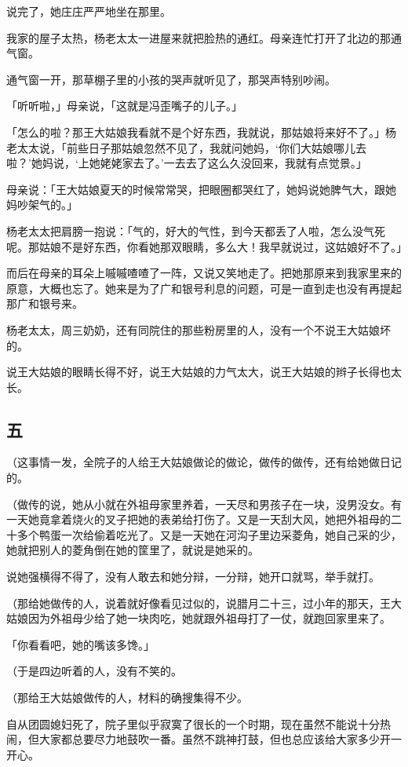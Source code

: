 \documentclass[UTF8]{ctexart}
\begin{document}
说完了，她庄庄严严地坐在那里。

我家的屋子太热，杨老太太一进屋来就把脸热的通红。母亲连忙打开了北边的那通气窗。

通气窗一开，那草棚子里的小孩的哭声就听见了，那哭声特别吵闹。

「听听啦，」母亲说，「这就是冯歪嘴子的儿子。」

「怎么的啦？那王大姑娘我看就不是个好东西，我就说，那姑娘将来好不了。」杨老太太说，「前些日子那姑娘忽然不见了，我就问她妈，‘你们大姑娘哪儿去啦？’她妈说，‘上她姥姥家去了。’一去去了这么久没回来，我就有点觉景。」

母亲说：「王大姑娘夏天的时候常常哭，把眼圈都哭红了，她妈说她脾气大，跟她妈吵架气的。」

杨老太太把肩膀一抱说：「气的，好大的气性，到今天都丢了人啦，怎么没气死呢。那姑娘不是好东西，你看她那双眼睛，多么大！我早就说过，这姑娘好不了。」

而后在母亲的耳朵上嘁嘁喳喳了一阵，又说又笑地走了。把她那原来到我家里来的原意，大概也忘了。她来是为了广和银号利息的问题，可是一直到走也没有再提起那广和银号来。

杨老太太，周三奶奶，还有同院住的那些粉房里的人，没有一个不说王大姑娘坏的。

说王大姑娘的眼睛长得不好，说王大姑娘的力气太大，说王大姑娘的辫子长得也太长。

\subsection{五}

（这事情一发，全院子的人给王大姑娘做论的做论，做传的做传，还有给她做日记的。

（做传的说，她从小就在外祖母家里养着，一天尽和男孩子在一块，没男没女。有一天她竟拿着烧火的叉子把她的表弟给打伤了。又是一天刮大风，她把外祖母的二十多个鸭蛋一次给偷着吃光了。又是一天她在河沟子里边采菱角，她自己采的少，她就把别人的菱角倒在她的筐里了，就说是她采的。

说她强横得不得了，没有人敢去和她分辩，一分辩，她开口就骂，举手就打。

（那给她做传的人，说着就好像看见过似的，说腊月二十三，过小年的那天，王大姑娘因为外祖母少给了她一块肉吃，她就跟外祖母打了一仗，就跑回家里来了。

「你看看吧，她的嘴该多馋。」

（于是四边听着的人，没有不笑的。

（那给王大姑娘做传的人，材料的确搜集得不少。

自从团圆媳妇死了，院子里似乎寂寞了很长的一个时期，现在虽然不能说十分热闹，但大家都总要尽力地鼓吹一番。虽然不跳神打鼓，但也总应该给大家多少开一开心。
\end{document}
